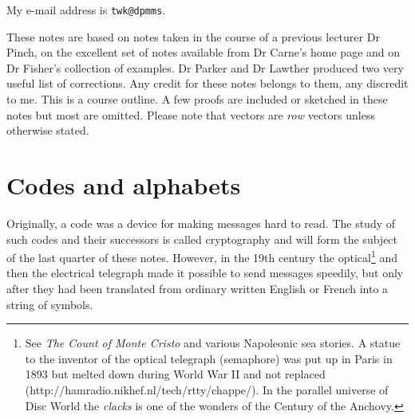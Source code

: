 \documentclass[12pt,a4paper]{article}
\theoremstyle{plain}
\theoremstyle{definition}
\begin{document}
    \begin{footnotesize}
        My e-mail address is \verb+twk@dpmms+.
    \end{footnotesize}

    \begin{footnotesize}
        These notes are based on notes taken in the course
        of a previous lecturer Dr Pinch, on the excellent
        set of notes available from Dr Carne's home page
        and on Dr Fisher's collection of examples.
        Dr Parker and Dr Lawther
        produced two very useful list of corrections.
        Any credit
        for these notes belongs to them, any discredit to me.
        This is a course outline. A few proofs are included
        or sketched in these notes but most are omitted.
        Please note that vectors are \emph{row} vectors
        unless otherwise stated.
    \end{footnotesize}
    \newpage
    \tableofcontents
    \section{Codes and alphabets}\label{S;alphabets}
    Originally, a code was a device for making messages
    hard to read. The study of such codes and their
    successors is called cryptography and will form
    the subject of the last quarter of these notes.
    However, in the 19th century the
    optical\footnote{See \emph{The Count of Monte Cristo}
    and various Napoleonic sea stories.
    A statue to the inventor of the optical telegraph
    (semaphore)
    was put up in Paris in 1893 but melted down during
    World War II and not replaced
    (http://hamradio.nikhef.nl/tech/rtty/chappe/).
    In the parallel universe of Disc World the
    \emph{clacks} is one of the wonders of the
    Century of the Anchovy.} and
    then the electrical telegraph made it
    possible to send messages speedily, but
    only after they had been translated from ordinary written
    English or French into a string of symbols.
\end{document}
